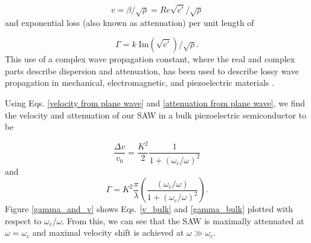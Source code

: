 \documentclass[double,12pt,1in]{beavtex}
\begin{document}
\begin{equation}
    v = \beta/\sqrt{\rho} = Re{\sqrt{c'}}/\sqrt{\rho} \label{velocity from plane wave}
\end{equation} 
and exponential loss (also known as attenuation) per unit length of 

\begin{equation}
    \Gamma = k \; \mathrm{Im}(\sqrt{c'})/\sqrt{\rho}. \label{attenuation from plane wave}
\end{equation} 
This use of a complex wave propagation constant, where the real and complex parts describe dispersion and attenuation, has been used to describe lossy wave propagation in mechanical, electromagnetic, and piezoelectric materials \cite{holland_representation_1967} \cite[p. 18]{pozar_microwave_2012} \cite{weinreich_acoustodynamic_1956, gonzalez_revisiting_2016}. 

Using Eqs. \ref{velocity from plane wave} and \ref{attenuation from plane wave}, we find the velocity and attenuation of our SAW in a bulk piezoelectric semiconductor to be

\begin{equation}
    \frac{\Delta v}{v_0} = \frac{K^2}{2}\frac{1}{1+(\omega_c/\omega)^2} \label{v_bulk}
\end{equation}
and
\begin{equation}
    \Gamma = K^2 \frac{\pi}{\lambda}\left(\frac{(\omega_c/\omega)}{1+(\omega_c/\omega)^2}\right). \label{gamma_bulk}
\end{equation}
Figure \ref{gamma_and_v} shows Eqs. \ref{v_bulk} and \ref{gamma_bulk} plotted with respect to  $\omega_c/\omega$. From this, we can see that the SAW is maximally attenuated at $\omega = \omega_c$ and maximal velocity shift is achieved at $\omega \gg \omega_c$.
\end{document}
